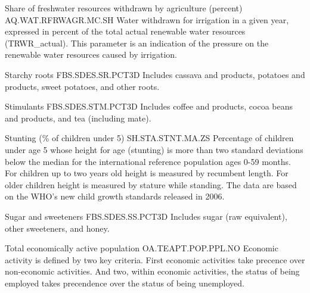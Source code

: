 \begin{MetadataCollection}
\begin{metadata}{ Share of freshwater resources withdrawn by agriculture (percent) }{ AQ.WAT.RFRWAGR.MC.SH }
Water withdrawn for irrigation in a given year, expressed in percent of the total actual renewable water resources (TRWR\_actual). This parameter is an indication of the pressure on the renewable water resources caused by irrigation. 
\end{metadata}

\begin{metadata}{ Starchy roots }{ FBS.SDES.SR.PCT3D }
Includes cassava and products, potatoes and products, sweet potatoes, and other roots. 
\end{metadata}

\begin{metadata}{ Stimulants }{ FBS.SDES.STM.PCT3D }
Includes coffee and products, cocoa beans and products, and tea (including mate). 
\end{metadata}

\begin{metadata}{ Stunting (\% of children under 5) }{ SH.STA.STNT.MA.ZS }
Percentage of children under age 5 whose height for age (stunting) is more than two standard deviations below the median for the international reference population ages 0-59 months. For children up to two years old height is measured by recumbent length. For older children height is measured by stature while standing. The data are based on the WHO's new child growth standards released in 2006. 
\end{metadata}

\begin{metadata}{ Sugar and sweeteners }{ FBS.SDES.SS.PCT3D }
Includes sugar (raw equivalent), other sweeteners, and honey. 
\end{metadata}

\begin{metadata}{ Total economically active population }{ OA.TEAPT.POP.PPL.NO }
Economic activity is defined by two key criteria. First economic activities take precence over non-economic activities. And two, within economic activities, the status of being employed takes precendence over the status of being unemployed. 
\end{metadata}


\end{MetadataCollection}
